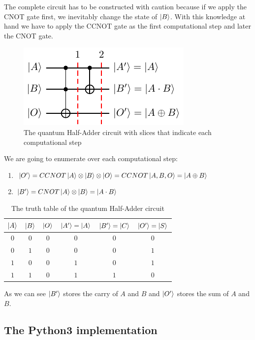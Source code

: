The complete circuit has to be constructed with caution because if we apply the CNOT gate first, we inevitably change the state of $\ket{B}$. With this
knowledge at hand we have to apply the CCNOT gate as the first computational step and later the CNOT gate.

\begin{figure}[ht]
    \centering
    \includegraphics{images/5_Implementation/half_adder.pdf}
    \caption{The quantum Half-Adder circuit with slices that indicate each computational step}
\end{figure}

We are going to enumerate over each computational step:
\begin{enumerate}
    \item $\ket{O'} = CCNOT\ket{A}\otimes\ket{B}\otimes\ket{O} = CCNOT\ket{A,B,O} = \ket{A \oplus B}$
    \item $\ket{B'} = CNOT\ket{A}\otimes\ket{B} = \ket{A \cdot B}$
\end{enumerate}

\begin{table}[ht]
    \centering
    \begin{tabular}{ccc|ccc}
        $\ket{A}$ & $\ket{B}$ & $\ket{O}$ & $\ket{A'} = \ket{A}$ & $\ket{B'} = \ket{C}$ & $\ket{O'} = \ket{S}$ \\
        \hline
        $0$ & $0$ & $0$ & $0$ & $0$ & $0$ \\
        $0$ & $1$ & $0$ & $0$ & $0$ & $1$ \\
        $1$ & $0$ & $0$ & $1$ & $0$ & $1$ \\
        $1$ & $1$ & $0$ & $1$ & $1$ & $0$ \\
    \end{tabular}
    \caption{The truth table of the quantum Half-Adder circuit}
\end{table}

As we can see $\ket{B'}$ stores the carry of $A$ and $B$ and $\ket{O'}$ stores the sum of $A$ and $B$.

\subsection{The Python3 implementation}

